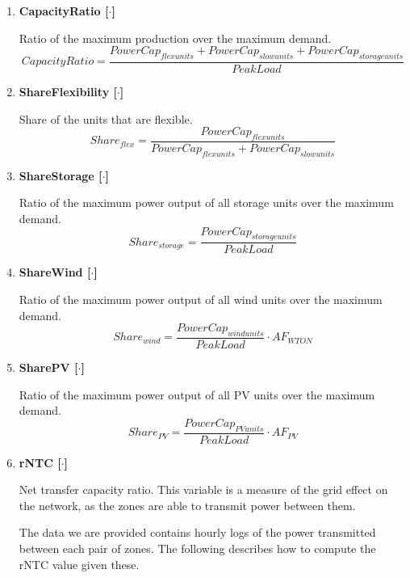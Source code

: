 \begin{enumerate}
    \item \textbf{CapacityRatio [$\cdot$]}
    
    Ratio of the maximum production over the maximum demand.
    \begin{equation}
        CapacityRatio  = \frac{PowerCap_{flex units}+Power Cap_{slow units}+PowerCap_{storage units}}{Peak Load}
    \end{equation}

    \item \textbf{ShareFlexibility [$\cdot$]}
    
    Share of the units that are flexible.
    \begin{equation}
        {Share_{flex}}=\frac{PowerCap_{flex units}}{Power Cap_{flex units}+PowerCap_{slow units}}	
    \end{equation}

    \item \textbf{ShareStorage [$\cdot$]}
    
    Ratio of the maximum power output of all storage units over the maximum demand.
    \begin{equation}
        {Share_{storage}}=\frac{PowerCap_{storage units}}{Peak Load}	
    \end{equation}

    \item \textbf{ShareWind [$\cdot$]}
    
    Ratio of the maximum power output of all wind units over the maximum demand.
    \begin{equation}
        Share_{wind}=\frac{PowerCap_{wind units}}{Peak Load}\cdot AF_{WTON}
    \end{equation}

    \item \textbf{SharePV [$\cdot$]}

    Ratio of the maximum power output of all PV units over the maximum demand.
    \begin{equation}
        {Share_{PV}}=\frac{PowerCap_{PV units}}{Peak Load}\cdot AF_{PV}
    \end{equation}

    \item \textbf{rNTC [$\cdot$]}
    
    Net transfer capacity ratio. This variable is a measure of the grid effect on the network, as the zones are able to transmit power between them.

    The data we are provided contains hourly logs of the power transmitted between each pair of zones. The following describes how to compute the rNTC value given these.


\end{enumerate}
